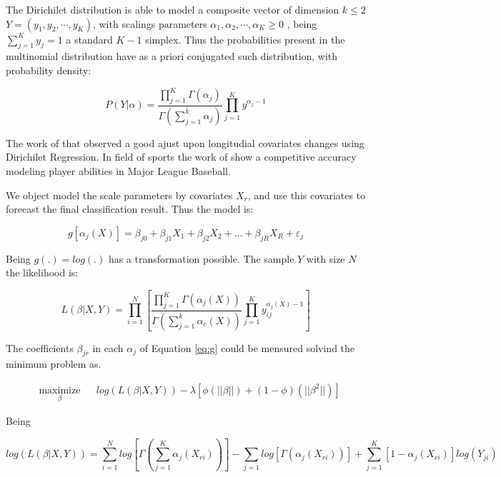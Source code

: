 \documentclass[doc,apacite,oneside,a4paper,12pt]{apa6}
\begin{document}
The Dirichilet distribution is able to model a composite vector of dimension $k\leq 2$ $Y = (y_1,y_2,\cdots,y_K)$, with scalings parameters $\alpha_1,\alpha_2,\cdots,\alpha_K\geq 0$ , being  $\sum_{j=1}^K y_j = 1$ a standard $K-1$ simplex. Thus the probabilities present in the multinomial distribution have as a priori conjugated such distribution, with probability density:


\begin{equation}
P(Y |\alpha) = \frac{\prod_{j=1}^K\Gamma(\alpha_j)}{\Gamma(\sum_{j=1}^k\alpha_j)}\prod_{j=1}^K y^{\alpha_j - 1}
\end{equation}


The work of \cite{Hijazi2009} that observed a good ajust upon longitudial covariates changes using Dirichilet Regression. In field of sports the work of \cite{Null2009} show a competitive accuracy modeling player abilities in Major League Baseball.

We object model the scale parameters by covariates $X_r$, and use this covariates to forecast the final classification result. Thus the model is:

\begin{equation}
g[\alpha_j(X)] =  \beta_{j0} + \beta_{j1} X_1 + \beta_{j2} X_2 + ... + \beta_{jR} X_R + \varepsilon_{j}
\label{eq:g}
\end{equation}

Being $g(.) = log(.)$  has a transformation possible.  The sample $Y$ with size $N$ the likelihood is:

\begin{equation*}
 L(\beta|X,Y) = \prod_{i=1}^N\left[ \frac{\prod_{j=1}^K\Gamma\left(\alpha_j(X)\right)}{\Gamma\left(\sum_{j=1}^k\alpha_c(X)\right)}\prod_{j=1}^K y_{ij}^{\alpha_j(X) - 1}\right]
 \end{equation*}
 

The coefficients $\beta_{jr}$ in each $\alpha_j$ of Equation \ref{eq:g} could be mensured solvind the minimum problem as.

\begin{equation}
\begin{aligned}
& \underset{\beta}{\text{maximize}}
& &   log(L(\beta|X,Y)) - \lambda\left[\phi(||\beta||) + (1-\phi)(||\beta^2||)\right]
\end{aligned}
\label{eq:vero}
 \end{equation}
 
 Being
 
\begin{equation*}
 log(L(\beta|X,Y)) = \sum_{i=1}^N log\left[\Gamma\left(\sum_{j=1}^K\alpha_j(X_{ri})\right)\right]	-\sum_{j=1}log\left[\Gamma\left(\alpha_j(X_{ri})\right)\right] + \sum_{j=1}^K[1-\alpha_j(X_{ri})]log\left(Y_{ji}\right)
 \label{eq:objfunc}
 \end{equation*}
\end{document}

